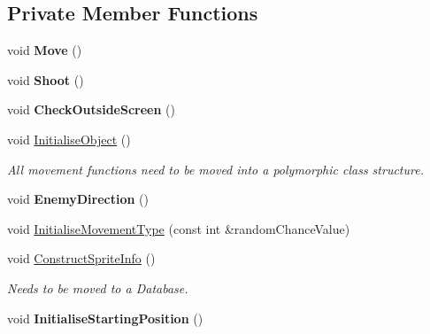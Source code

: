 \subsection*{Private Member Functions}
\begin{DoxyCompactItemize}
\item 
\mbox{\label{class_enemy_a30471ff0b5b7bf3b31d3b8ece0005e9a}} 
void {\bfseries Move} ()
\item 
\mbox{\label{class_enemy_ab526cfaf13910e15ca1e5e84ef230dd1}} 
void {\bfseries Shoot} ()
\item 
\mbox{\label{class_enemy_a06fafdc67bd76334adb9d47f73f15aff}} 
void {\bfseries Check\+Outside\+Screen} ()
\item 
\mbox{\label{class_enemy_aef1f4614b8bb29980071585b6f09139f}} 
void \hyperlink{class_enemy_aef1f4614b8bb29980071585b6f09139f}{Initialise\+Object} ()
\begin{DoxyCompactList}\small\item\em All movement functions need to be moved into a polymorphic class structure. \end{DoxyCompactList}\item 
\mbox{\label{class_enemy_aa72305c74fd05140de6a8a986532b0c7}} 
void {\bfseries Enemy\+Direction} ()
\item 
void \hyperlink{class_enemy_adcd3f46bb06898b340f50c4a22bb3f68}{Initialise\+Movement\+Type} (const int \&random\+Chance\+Value)
\item 
\mbox{\label{class_enemy_a78f7ece0392dd209112e1ce3eccaece2}} 
void \hyperlink{class_enemy_a78f7ece0392dd209112e1ce3eccaece2}{Construct\+Sprite\+Info} ()
\begin{DoxyCompactList}\small\item\em Needs to be moved to a Database. \end{DoxyCompactList}\item 
\mbox{\label{class_enemy_a19e20e71247a6e310753366a29ae9142}} 
void {\bfseries Initialise\+Starting\+Position} ()
\item 
\mbox{\label{class_enemy_abefc309bb54bedbd106e27ec816fa899}} 

\end{DoxyCompactItemize}
